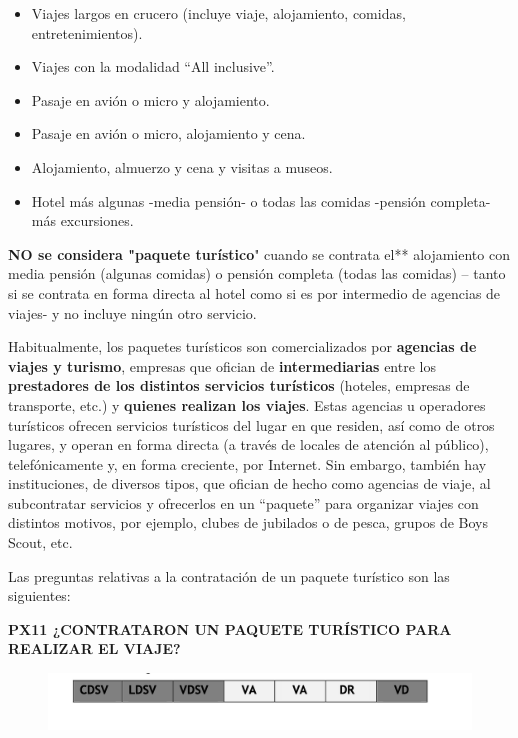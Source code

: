 \documentclass[
  openany]{book}
\begin{document}
\begin{itemize}
\item
  Viajes largos en crucero (incluye viaje, alojamiento, comidas, entretenimientos).
\item
  Viajes con la modalidad ``All inclusive''.
\item
  Pasaje en avión o micro y alojamiento.
\item
  Pasaje en avión o micro, alojamiento y cena.
\item
  Alojamiento, almuerzo y cena y visitas a museos.
\item
  Hotel más algunas -media pensión- o todas las comidas -pensión completa- más excursiones.
\end{itemize}

\textbf{NO se considera "paquete turístico}" cuando se contrata el** alojamiento con media pensión (algunas comidas) o pensión completa (todas las comidas) -- tanto si se contrata en forma directa al hotel como si es por intermedio de agencias de viajes- y no incluye ningún otro servicio.

Habitualmente, los paquetes turísticos son comercializados por \textbf{agencias de viajes y turismo}, empresas que ofician de \textbf{intermediarias} entre los \textbf{prestadores de los distintos servicios turísticos} (hoteles, empresas de transporte, etc.) y \textbf{quienes realizan los viajes}. Estas agencias u operadores turísticos ofrecen servicios turísticos del lugar en que residen, así como de otros lugares, y operan en forma directa (a través de locales de atención al público), telefónicamente y, en forma creciente, por Internet. Sin embargo, también hay instituciones, de diversos tipos, que ofician de hecho como agencias de viaje, al subcontratar servicios y ofrecerlos en un ``paquete'' para organizar viajes con distintos motivos, por ejemplo, clubes de jubilados o de pesca, grupos de Boys Scout, etc.

Las preguntas relativas a la contratación de un paquete turístico son las siguientes:

\textbf{PX11 ¿CONTRATARON UN PAQUETE TURÍSTICO PARA REALIZAR EL VIAJE?}

\begin{figure}

{\centering \includegraphics[width=1\linewidth]{imagenes/figura6-102} 

}

\end{figure}
\end{document}
